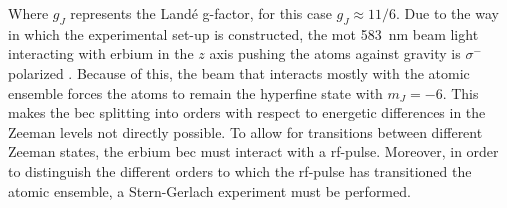 Where $g_J$ represents the Landé g-factor, for this case $g_J\approx11/6$. Due to the way in which the experimental set-up is constructed, the \ac{mot} \SI{583}{\nano\meter} beam light interacting with erbium in the $z$ axis pushing the atoms against gravity  is $\sigma^-$ polarized \cite{Ulitzsch2016}. Because of this, the beam that interacts mostly with the atomic ensemble forces the atoms to remain the hyperfine state with $m_J = -6$. This makes the \ac{bec} splitting into orders with respect to energetic differences in the Zeeman levels not directly possible. To allow for transitions between different Zeeman states, the erbium \ac{bec} must interact with a \acf{rf}-pulse. Moreover, in order to distinguish the different orders to which the \ac{rf}-pulse has transitioned the atomic ensemble, a Stern-Gerlach experiment must be performed.



